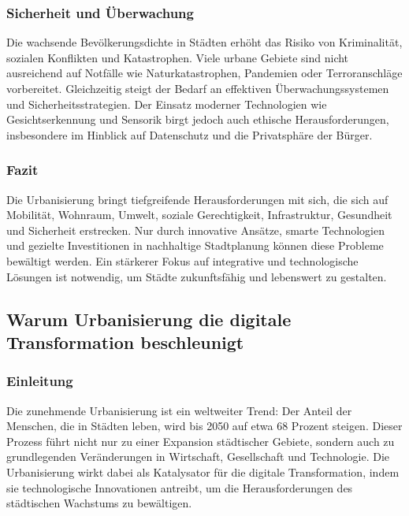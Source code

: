 \documentclass[conference,compsoc,final,a4paper, onecolumn, 11pt]{IEEEtran}
\begin{document}
\subsubsection{ Sicherheit und Überwachung}
Die wachsende Bevölkerungsdichte in Städten erhöht das Risiko von Kriminalität, sozialen Konflikten und Katastrophen. 
Viele urbane Gebiete sind nicht ausreichend auf Notfälle wie Naturkatastrophen, Pandemien oder Terroranschläge vorbereitet. 
Gleichzeitig steigt der Bedarf an effektiven Überwachungssystemen und Sicherheitsstrategien. 
Der Einsatz moderner Technologien wie Gesichtserkennung und Sensorik birgt jedoch auch ethische Herausforderungen, insbesondere im Hinblick auf Datenschutz und die Privatsphäre der Bürger.\autocite{mckinsey_smart_cities}


\subsubsection{Fazit}
Die Urbanisierung bringt tiefgreifende Herausforderungen mit sich, die sich auf Mobilität, Wohnraum, Umwelt, soziale Gerechtigkeit, Infrastruktur, Gesundheit und Sicherheit erstrecken. 
Nur durch innovative Ansätze, smarte Technologien und gezielte Investitionen in nachhaltige Stadtplanung können diese Probleme bewältigt werden. 
Ein stärkerer Fokus auf integrative und technologische Lösungen ist notwendig, um Städte zukunftsfähig und lebenswert zu gestalten.


\subsection{Warum Urbanisierung die digitale Transformation beschleunigt}
\subsubsection{Einleitung}
Die zunehmende Urbanisierung ist ein weltweiter Trend: Der Anteil der Menschen, die in Städten leben, wird bis 2050 auf etwa 68 Prozent steigen. 
Dieser Prozess führt nicht nur zu einer Expansion städtischer Gebiete, sondern auch zu grundlegenden Veränderungen in Wirtschaft, Gesellschaft und Technologie. 
Die Urbanisierung wirkt dabei als Katalysator für die digitale Transformation, indem sie technologische Innovationen antreibt, um die Herausforderungen des städtischen Wachstums zu bewältigen.
 
\end{document}
